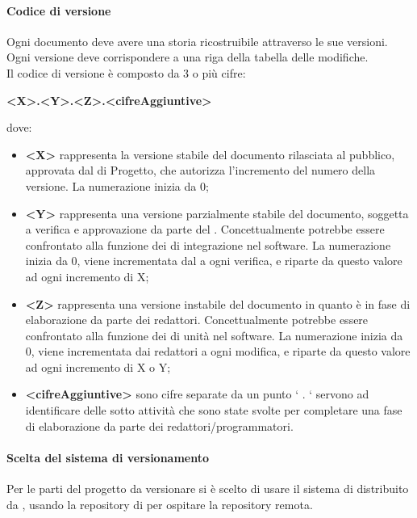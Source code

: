             \paragraph{Codice di versione}
                Ogni documento deve avere una storia ricostruibile attraverso le sue versioni.  \\
                Ogni versione deve corrispondere a una riga della tabella delle modifiche. \\
                Il codice di versione è composto da 3 o più cifre: \\
                \begin{center}
                    \textbf{<X>.<Y>.<Z>.<cifreAggiuntive>}
                \end{center}
                dove:
                \begin{itemize}
                    \item\textbf{<X>} rappresenta la versione stabile del documento rilasciata al pubblico, approvata dal  di Progetto, che autorizza l’incremento del numero della versione. La numerazione inizia da 0;
                    \item\textbf{<Y>} rappresenta una versione parzialmente stabile del documento, soggetta a verifica e approvazione da parte del . Concettualmente potrebbe essere confrontato alla funzione dei  di integrazione nel software. La numerazione inizia da 0, viene incrementata dal  a ogni verifica, e riparte da questo valore ad ogni incremento di X;
                    \item\textbf{<Z>} rappresenta una versione instabile del documento in quanto è in fase di elaborazione da parte dei redattori. Concettualmente potrebbe essere confrontato alla funzione dei  di unità nel software. La numerazione inizia da 0, viene incrementata dai redattori a ogni modifica, e riparte da questo valore ad ogni incremento di X o Y;
                    \item\textbf{<cifreAggiuntive>} sono cifre separate da un punto ‘ . ‘ servono ad identificare delle sotto attività che sono state svolte per completare una fase di elaborazione da parte dei redattori/programmatori.
                \end{itemize}
            \paragraph{Scelta del sistema di versionamento}
                Per le parti del progetto da versionare si è scelto di usare il sistema di  distribuito da , usando la repository di  per ospitare la repository remota.
